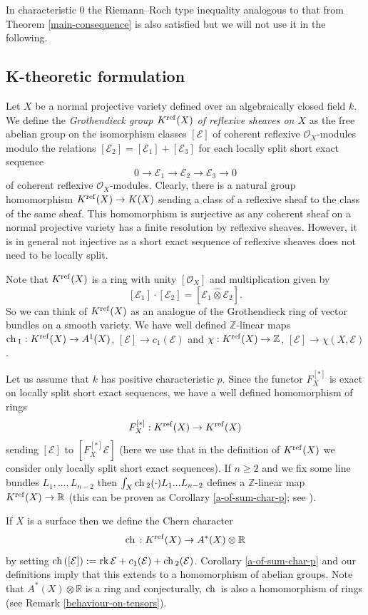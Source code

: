 \documentclass[twoside, 11pt]{article}
\theoremstyle{plain}
\theoremstyle{definition}
\theoremstyle{remark}
\newcommand{\ZZ}{{\mathbb Z}}
\newcommand{\RR}{{\mathbb R}}
\newcommand{\cE}{{\mathcal E}}
\newcommand{\cO}{{\mathcal O}}
\newcommand{\ch}{{\mathop{\rm ch \, }}}
\newcommand{\rk}{{\mathop{\rm rk \,}}}
\newcommand{\refl}{{\mathop{\operatorname{\rm ref} }}}
\begin{document}
\medskip


In characteristic $0$ the Riemann--Roch type inequality analogous to that from Theorem \ref{main-consequence} is also satisfied but we will not use it in the following.


\subsection{K-theoretic formulation}\label{K-theory-reflexive}

Let $X$ be a normal projective  variety defined over an algebraically closed field $k$.
We define the \emph{Grothendieck group $K^{\refl }(X)$  of reflexive sheaves on $X$} as 
the free abelian group on the isomorphism classes $[\cE]$ of coherent reflexive $\cO_X$-modules modulo
the relations $[\cE_2]=[\cE_1]+[\cE_3]$ for each locally split short exact sequence
$$0\to \cE_1\to \cE_2\to \cE_3\to 0$$
of coherent reflexive $\cO_X$-modules. 
Clearly, there is a natural group homomorphism $K^{\refl }(X)\to K(X)$ sending a class of a reflexive sheaf to the class of the same sheaf. This homomorphism is surjective as any coherent sheaf on a normal projective variety has a finite resolution by reflexive sheaves. However, it is in general not injective as a short exact sequence of reflexive sheaves does not need to be locally split.


Note that $K^{\refl }(X)$ is a ring with unity  $[\cO_X]$ and
multiplication given by
$$[\cE_1]\cdot [\cE_2]=[\cE_1\hat{\otimes} \cE_2].$$
So we can think of $K^{\refl }(X)$ as an analogue of the Grothendieck ring of vector bundles on a smooth variety. 
We have well defined  $\ZZ$-linear maps $\ch_1: K^{\refl}(X)\to A^1(X)$, $[\cE]\to c_1(\cE)$ 
and $\chi: K^{\refl } (X)\to \ZZ$, $[\cE]\to \chi (X, \cE)$.


Let us assume that  $k$ has positive characteristic $p$. Since the functor $F_X^{[*]}$ is exact on locally split short exact sequences, we have a well defined homomorphism of rings
$$F_X^{[*]}:  K^{\refl }(X)\to  K^{\refl } (X)$$
sending $[\cE]$ to $[F_X^{[*]}\cE]$ (here we use that in the definition of $K^{\refl }(X)$ we consider only locally split short exact sequences). If $n\ge 2$ and we fix some line bundles $L_1,...,L_{n-2}$ then
$\int_X\ch_2 (\cdot)L_1...L_{n-2}$ defines a $\ZZ$-linear map $K^{\refl }(X)\to \RR$ (this can be proven 
as Corollary \ref{a-of-sum-char-p}; see \cite[Lemma 2.1]{La4}). 

If $X$ is a surface then we define the Chern character
$$\ch: K^{\refl }(X)\to A^*(X)\otimes \RR$$
by setting $\ch ([\cE]):=\rk \cE +c_1(\cE)+\ch_2(\cE)$.  Corollary \ref{a-of-sum-char-p}
and our definitions imply that this extends to a homomorphism of abelian groups. Note that $A^*(X)\otimes \RR$ is a ring and conjecturally, $\ch$ is also a homomorphism of rings (see Remark \ref{behaviour-on-tensors}). 
\end{document}

